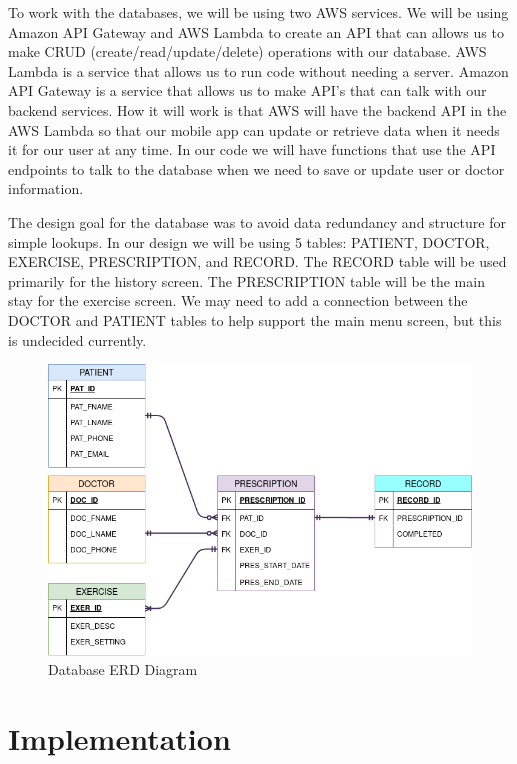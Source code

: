 \documentclass[a4paper,10pt]{article}
\begin{document}
	To work with the databases, we will be using two AWS services. We will be using Amazon API Gateway and AWS Lambda to create an API that can allows us to make CRUD (create/read/update/delete) operations with our database. AWS Lambda is a service that allows us to run code without needing a server. Amazon API Gateway is a service that allows us to make API's that can talk with our backend services. How it will work is that AWS will have the backend API in the AWS Lambda so that our mobile app can update or retrieve data when it needs it for our user at any time. In our code we will have functions that use the API endpoints to talk to the database when we need to save or update user or doctor information. 

            
            The design goal for the database was to avoid data redundancy and structure for simple lookups. In our design we will be using 5 tables: PATIENT, DOCTOR, EXERCISE, PRESCRIPTION, and RECORD. The RECORD table will be used primarily for the history screen. The PRESCRIPTION table will be the main stay for the exercise screen. We may need to add a connection between the DOCTOR and PATIENT tables to help support the main menu screen, but this is undecided currently. 
            
            \begin{figure}[H]
            \centering
            \includegraphics[width=140mm, scale=1]{databaseDiagram}
            \caption{Database ERD Diagram}
            \end{figure}
            

\section{Implementation}
\end{document}
